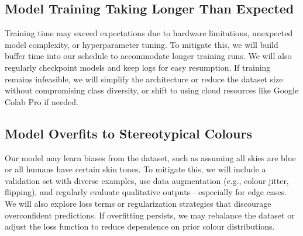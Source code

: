 \documentclass{article} %
\begin{document}
\subsection{Model Training Taking Longer Than Expected}
Training time may exceed expectations due to hardware limitations, unexpected model complexity, or hyperparameter tuning. 
To mitigate this, we will build buffer time into our schedule to accommodate longer training runs. We will also regularly 
checkpoint models and keep logs for easy resumption. If training remains infeasible, we will simplify the architecture or 
reduce the dataset size without compromising class diversity, or shift to using cloud resources like Google Colab Pro if needed.

\subsection{Model Overfits to Stereotypical Colours}
Our model may learn biases from the dataset, such as assuming all skies are blue or all humans have certain skin tones. 
To mitigate this, we will include a validation set with diverse examples, use data augmentation (e.g., colour jitter, flipping), 
and regularly evaluate qualitative outputs—especially for edge cases. We will also explore loss terms or regularization 
strategies that discourage overconfident predictions. If overfitting persists, we may rebalance the dataset or adjust the 
loss function to reduce dependence on prior colour distributions.

\label{last_page}

\newpage



\newpage
\end{document}
